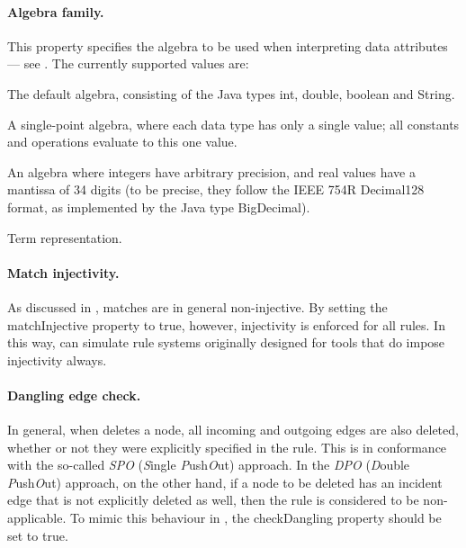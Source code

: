 \paragraph{Algebra family.}

This property specifies the algebra to be used when interpreting data
attributes --- see . The currently supported values are:
%
\begin{description}\noitemsep
\item[\textsf{default}] The default algebra, consisting of the Java types
  \textsf{int}, \textsf{double}, \textsf{boolean} and \textsf{String}.
\item[\textsf{point}] A single-point algebra, where each data type has only a
  single value; all constants and operations evaluate to this one value.
\item[\textsf{big}] An algebra where integers have arbitrary precision, and
  real values have a mantissa of 34 digits (to be precise, they follow the
  IEEE 754R Decimal128 format, as implemented by the Java type
  \textsf{BigDecimal}).
\item[\textsf{term}] Term representation.
\end{description}

\paragraph{Match injectivity.}

As discussed in , matches are in general non-injective. By
setting the \textsf{matchInjective} property to \textsf{true}, however,
injectivity is enforced for all rules. In this way, \GROOVE{} can simulate rule
systems originally designed for tools that do impose injectivity always.

\paragraph{Dangling edge check.}

In general, when \GROOVE{} deletes a node, all incoming and outgoing edges are
also deleted, whether or not they were explicitly specified in the rule. This
is in conformance with the so-called \emph{SPO} (\emph{S}ingle
\emph{P}ush\emph{O}ut) approach. In the \emph{DPO} (\emph{D}ouble
\emph{P}ush\emph{O}ut) approach, on the other hand, if a node to be deleted has
an incident edge that is not explicitly deleted as well, then the rule is
considered to be non-applicable. To mimic this behaviour in \GROOVE, the
\textsf{checkDangling} property should be set to \textsf{true}.

